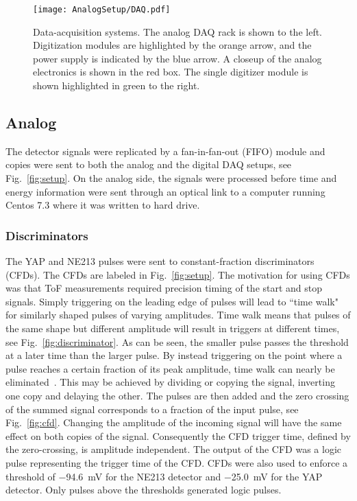 \documentclass[main.tex]{subfiles}
\begin{document}
\begin{figure}[h]
    \centering
        \texttt{[image: AnalogSetup/DAQ.pdf]}
        \caption[Data-acquisition systems.]{Data-acquisition systems. The analog DAQ rack is shown to the left. Digitization modules are highlighted by the orange arrow, and the power supply is indicated by the blue arrow. A closeup of the analog electronics is shown in the red box. The single digitizer module is shown highlighted in green to the right.}
    \label{fig:DAQ}
\end{figure}

\subsection{Analog}
The detector signals were replicated by a fan-in-fan-out (FIFO) module and copies were sent to both the analog and the digital DAQ setups, see Fig.~\ref{fig:setup}. On the analog side, the signals were processed before time and energy information were sent through an optical link to a computer running Centos 7.3 where it was written to hard drive. 

\subsubsection{Discriminators}
The YAP and NE213 pulses were sent to constant-fraction discriminators (CFDs). The CFDs are labeled  in Fig.~\ref{fig:setup}. The motivation for using CFDs was that ToF measurements required precision timing of the start and stop signals. Simply triggering on the leading edge of pulses will lead to ``time walk" for similarly shaped pulses of varying amplitudes. Time walk means that pulses of the same shape but different amplitude will result in triggers at different times, see Fig.~\ref{fig:discriminator}. As can be seen, the smaller pulse passes the threshold at a later time than the larger pulse. By instead triggering on the point where a pulse reaches a certain fraction of its peak amplitude, time walk can nearly be eliminated~\cite{Leo}. This may be achieved by dividing or copying the signal, inverting one copy and delaying the other. The pulses are then added and the zero crossing of the summed signal corresponds to a fraction of the input pulse, see Fig.~\ref{fig:cfd}. Changing the amplitude of the incoming signal will have the same effect on both copies of the signal. Consequently the CFD trigger time, defined by the zero-crossing, is amplitude independent. The output of the CFD was a logic pulse representing the trigger time of the CFD. CFDs were also used to enforce a threshold of \SI{-94.6}{mV} for the NE213 detector and \SI{-25.0}{mV} for the YAP detector. Only pulses above the thresholds generated logic pulses.
\end{document}
